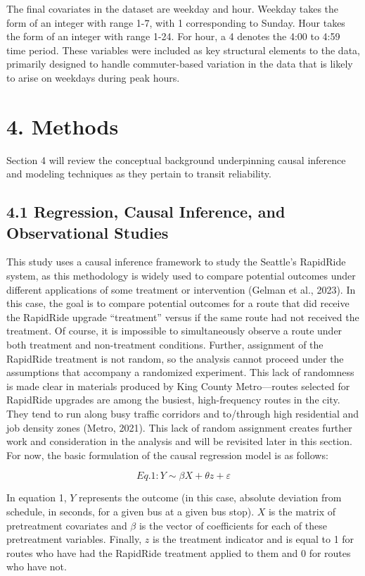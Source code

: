 \documentclass[
  12pt,
]{article}
\begin{document}
The final covariates in the dataset are weekday and hour. Weekday takes
the form of an integer with range 1-7, with 1 corresponding to Sunday.
Hour takes the form of an integer with range 1-24. For hour, a 4 denotes
the 4:00 to 4:59 time period. These variables were included as key
structural elements to the data, primarily designed to handle
commuter-based variation in the data that is likely to arise on weekdays
during peak hours.

\section{4. Methods}\label{methods}

Section 4 will review the conceptual background underpinning causal
inference and modeling techniques as they pertain to transit
reliability.

\subsection{4.1 Regression, Causal Inference, and Observational
Studies}\label{regression-causal-inference-and-observational-studies}

This study uses a causal inference framework to study the Seattle's
RapidRide system, as this methodology is widely used to compare
potential outcomes under different applications of some treatment or
intervention (Gelman et al., 2023). In this case, the goal is to compare
potential outcomes for a route that did receive the RapidRide upgrade
``treatment'' versus if the same route had not received the treatment.
Of course, it is impossible to simultaneously observe a route under both
treatment and non-treatment conditions. Further, assignment of the
RapidRide treatment is not random, so the analysis cannot proceed under
the assumptions that accompany a randomized experiment. This lack of
randomness is made clear in materials produced by King County
Metro---routes selected for RapidRide upgrades are among the busiest,
high-frequency routes in the city. They tend to run along busy traffic
corridors and to/through high residential and job density zones (Metro,
2021). This lack of random assignment creates further work and
consideration in the analysis and will be revisited later in this
section. For now, the basic formulation of the causal regression model
is as follows:

\[Eq. 1: Y \sim \beta X + \theta z + \varepsilon\]

In equation 1, \(Y\) represents the outcome (in this case, absolute
deviation from schedule, in seconds, for a given bus at a given bus
stop). \(X\) is the matrix of pretreatment covariates and \(\beta\) is
the vector of coefficients for each of these pretreatment variables.
Finally, \(z\) is the treatment indicator and is equal to 1 for routes
who have had the RapidRide treatment applied to them and 0 for routes
who have not.
\end{document}
